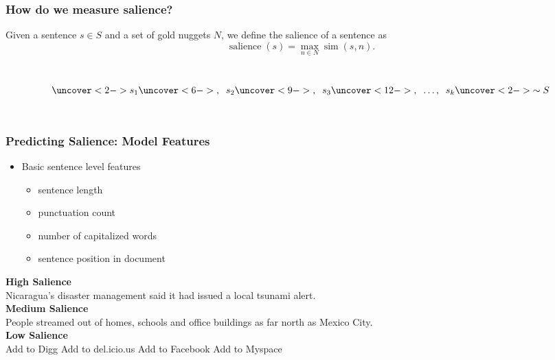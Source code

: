 \documentclass{beamer}
\begin{document}
\begin{frame}
    \frametitle{How do we measure salience?}

    Given a sentence $s \in S$ and a set of gold nuggets $N$, we define the 
    salience of a sentence as
    $$\operatorname{salience}(s) = \max_{n \in N} \operatorname{sim}(s,n).$$

    ~\\
    $$\uncover<2->{s_1 }\uncover<6->{,\;\; s_2} 
         \uncover<9->{,\;\; s_3} 
         \uncover<12->{,\;\; \ldots,\;\; s_k}\uncover<2->{ \sim S}$$
    ~\\
    \begin{center}
    \end{center}
\end{frame}
\begin{frame}
\frametitle{Predicting Salience: Model Features}
\begin{itemize}
\item Basic sentence level features
\begin{itemize}
\item sentence length
\item punctuation count
\item \alert<2-4>{number of capitalized words}
\item sentence position in document
\end{itemize}
\end{itemize}

\pause
\textbf{High Salience}\\ 
\alert<2>{Nicaragua's} disaster management said it had issued a local tsunami alert.\\
\textbf{Medium Salience} \\
\alert<3>{People} streamed out of homes, schools and office buildings as far north as \alert<3>{Mexico City.}\\

\textbf{Low Salience} \\
\alert<4>{Add} to \alert<4>{Digg Add} to del.icio.us \alert<4>{Add} to \alert<4>{Facebook Add} to \alert<4>{Myspace} 

\end{frame}
\end{document}
